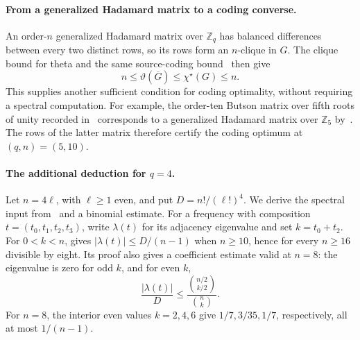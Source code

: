 \documentclass[11pt,a4paper]{article}
\numberwithin{equation}{section}
\numberwithin{figure}{section}
\numberwithin{table}{section}
\numberwithin{footnote}{section}
\theoremstyle{informal}\newtheorem*{informaltheorem}{Informal theorem}
\theoremstyle{definition}\newtheorem{example}{Example}[section]
\theoremstyle{remark}\newtheorem{remark}[theorem]{Remark}
\newcommand{\Z}{\mathbb Z}
\newcommand{\chs}{\chi^{\star}}
\begin{document}
\paragraph{From a generalized Hadamard matrix to a coding converse.}
An order-\(n\) generalized Hadamard matrix over \(\Z_q\) has
balanced differences between every two distinct rows, so its rows
form an \(n\)-clique in \(G\). The clique bound for theta and
the same source-coding bound~\cite{bblps} then give
\begin{equation}
 n\leq\vartheta(\overline G)\leq\chs(G)\leq n.
\end{equation}
This supplies another sufficient condition for coding optimality,
without requiring a spectral computation. For example, the
order-ten Butson matrix over fifth roots of unity recorded
in~\cite[Remark~5.11]{efo} corresponds to a generalized Hadamard
matrix over \(\Z_5\) by~\cite[Lemma~2.3]{efo}. The rows of the
latter matrix therefore certify
the coding optimum at \((q,n)=(5,10)\).

\paragraph{The additional deduction for \(q=4\).}
Let \(n=4\ell\), with \(\ell\geq1\) even, and put \(D=n!/(\ell!)^4\).
We derive the spectral input from~\cite[Lemmas~4.5--4.7]{nkz}
and a binomial estimate. For a frequency with composition
\(t=(t_0,t_1,t_2,t_3)\), write \(\lambda(t)\) for its
adjacency eigenvalue and set \(k=t_0+t_2\).
For \(0<k<n\), \cite[Lemma~4.7]{nkz} gives
\(|\lambda(t)|\leq D/(n-1)\) when \(n\geq10\), hence for
every \(n\geq16\) divisible by eight. Its proof also gives a
coefficient estimate valid at \(n=8\): the eigenvalue is zero
for odd \(k\), and for even \(k\),
\begin{equation}
 \frac{|\lambda(t)|}{D}
 \leq\frac{\binom{n/2}{k/2}}{\binom nk}.
\end{equation}
For \(n=8\), the interior even values \(k=2,4,6\) give
\(1/7,3/35,1/7\), respectively, all at most \(1/(n-1)\).
\end{document}

